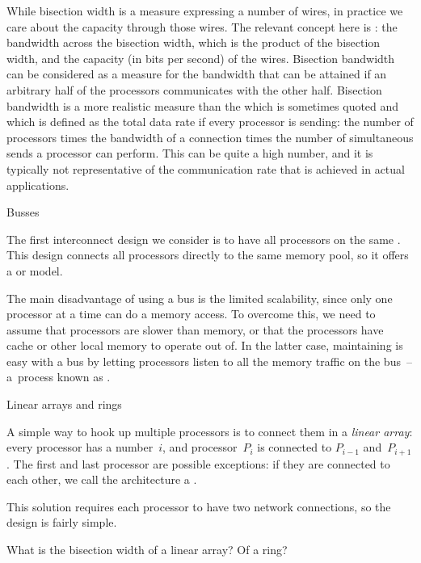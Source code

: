 While bisection width is a measure expressing a number of wires, in
practice we care about the capacity through those wires. The relevant
concept here is : the bandwidth across
the bisection width, which is the product of the bisection width, and
the capacity (in bits per second) of the wires.  
%
Bisection bandwidth
can be considered as a measure for the bandwidth that can be attained
if an arbitrary half of the processors communicates with the other
half.
Bisection bandwidth is a more realistic measure than the
 which is sometimes quoted
and which is defined
as the  total data rate if every processor is sending: the number of
processors times the bandwidth of a connection times the number of
simultaneous sends a processor can perform. This can be quite
a high number, and it is typically not representative of the
communication rate that is achieved in actual applications.

 {Busses}

The first interconnect design we consider is to have all processors
on the same . This design connects
all processors directly to the same memory pool, so it offers
a  or  model.

The main disadvantage of using a bus is the limited scalability,
since only one processor at a time can do a memory access. To overcome this,
we need to assume that processors are slower than memory,
or that the processors have cache or other local memory to operate out of.
In the latter case, maintaining 
is easy with a bus by letting processors listen to all the memory traffic
on the bus~-- a~process known as .

 {Linear arrays and rings}

A simple way to hook up multiple processors is to connect them in a
\emph{linear array}: every processor has a number~$i$, and
processor~$P_i$ is connected to $P_{i-1}$ and~$P_{i+1}$. The first and
last processor are possible exceptions: if they are connected to each
other, we call the architecture a .

This solution requires each processor to have two network connections,
so the design is fairly simple.

\begin{exercise}
  \label{ex:linear-bisection}
  What is the bisection width of a linear array? Of a ring?
\end{exercise}

